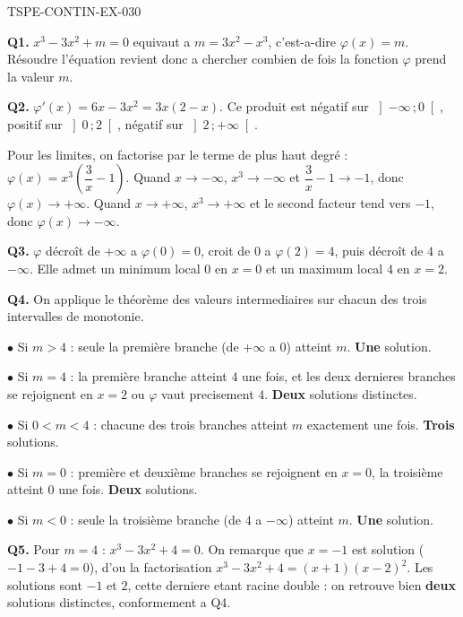 \begin{corrige}{TSPE-CONTIN-EX-030}

\textbf{Q1.} $x^3 - 3x^2 + m = 0$ equivaut a $m = 3x^2 - x^3$, c'est-a-dire $\varphi(x) = m$. Résoudre l'équation revient donc a chercher combien de fois la fonction $\varphi$ prend la valeur $m$.

\textbf{Q2.} $\varphi'(x) = 6x - 3x^2 = 3x(2-x)$. Ce produit est négatif sur $\left]-\infty\,;0\right[$, positif sur $\left]0\,;2\right[$, négatif sur $\left]2\,;+\infty\right[$.

Pour les limites, on factorise par le terme de plus haut degré : $\varphi(x) = x^3\left(\dfrac{3}{x} - 1\right)$. Quand $x \to -\infty$, $x^3 \to -\infty$ et $\dfrac{3}{x} - 1 \to -1$, donc $\varphi(x) \to +\infty$. Quand $x \to +\infty$, $x^3 \to +\infty$ et le second facteur tend vers $-1$, donc $\varphi(x) \to -\infty$.

\textbf{Q3.} $\varphi$ décroît de $+\infty$ a $\varphi(0) = 0$, croit de $0$ a $\varphi(2) = 4$, puis décroît de $4$ a $-\infty$. Elle admet un minimum local $0$ en $x = 0$ et un maximum local $4$ en $x = 2$.

\textbf{Q4.} On applique le théorème des valeurs intermediaires sur chacun des trois intervalles de monotonie.

$\bullet$ Si $m > 4$ : seule la première branche (de $+\infty$ a $0$) atteint $m$. \textbf{Une} solution.

$\bullet$ Si $m = 4$ : la première branche atteint $4$ une fois, et les deux dernieres branches se rejoignent en $x = 2$ ou $\varphi$ vaut precisement $4$. \textbf{Deux} solutions distinctes.

$\bullet$ Si $0 < m < 4$ : chacune des trois branches atteint $m$ exactement une fois. \textbf{Trois} solutions.

$\bullet$ Si $m = 0$ : première et deuxième branches se rejoignent en $x = 0$, la troisième atteint $0$ une fois. \textbf{Deux} solutions.

$\bullet$ Si $m < 0$ : seule la troisième branche (de $4$ a $-\infty$) atteint $m$. \textbf{Une} solution.

\textbf{Q5.} Pour $m = 4$ : $x^3 - 3x^2 + 4 = 0$. On remarque que $x = -1$ est solution ($-1 - 3 + 4 = 0$), d'ou la factorisation $x^3 - 3x^2 + 4 = (x+1)(x-2)^2$. Les solutions sont $-1$ et $2$, cette derniere etant racine double : on retrouve bien \textbf{deux} solutions distinctes, conformement a Q4.
\end{corrige}
